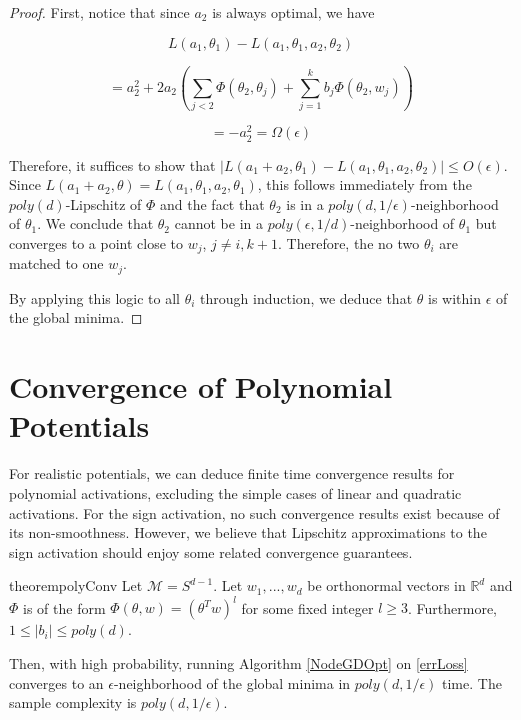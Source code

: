 \documentclass{article}
\newcommand{\R}{{\mathbb{R}}}
\begin{document}
\begin{proof}
First, notice that since $a_2$ is always optimal, we have

\[L(a_1,\theta_1) - L(a_1,\theta_1,a_2,\theta_2)\]

\[ = a_2^2 + 2a_2 (\sum_{j < 2} \Phi(\theta_2,\theta_j) + \sum_{j=1}^k b_j \Phi(\theta_2,w_j)) \]

\[ = -a_2^2 = \Omega(\epsilon)\]

Therefore, it suffices to show that $|L(a_1+a_2,\theta_1) - L(a_1,\theta_1,a_2,\theta_2) | \leq O(\epsilon)$. Since $L(a_1+a_2,\theta) = L(a_1,\theta_1,a_2,\theta_1)$, this follows immediately from the $poly(d)$-Lipschitz of $\Phi$ and the fact that $\theta_2$ is in a $poly(d,1/\epsilon)$-neighborhood of $\theta_1$. We conclude that $\theta_2$ cannot be in a $poly(\epsilon,1/d)$-neighborhood of $\theta_1$ but converges to a point close to $w_{j}$, $j\neq i,k+1$. Therefore, the no two $\theta_i$ are matched to one $w_j$. 

By applying this logic to all $\theta_i$ through induction, we deduce that $\theta$ is within $\epsilon$ of the global minima.
\end{proof}


\section{Convergence of Polynomial Potentials}


For realistic potentials, we can deduce finite time convergence results for polynomial activations, excluding the simple cases of linear and quadratic activations. For the sign activation, no such convergence results exist because of its non-smoothness. However, we believe that Lipschitz approximations to the sign activation should enjoy some related convergence guarantees.


\begin{restatable}{theorem}{polyConv}
\label{PolyConv}
Let $\mathcal{M} = S^{d-1}$. Let $w_1,...,w_d$ be orthonormal vectors in $\R^d$ and $\Phi$ is of the form $\Phi(\theta,w) = (\theta^Tw)^l$ for some fixed integer $l \geq 3$. Furthermore, $1 \leq |b_i|\leq poly(d)$. 

Then, with high probability, running Algorithm \ref{NodeGDOpt} on \eqref{errLoss} converges to an $\epsilon$-neighborhood of the global minima in $poly(d,1/\epsilon)$ time. The sample complexity is $poly(d,1/\epsilon)$.
\end{restatable}


\end{document}
